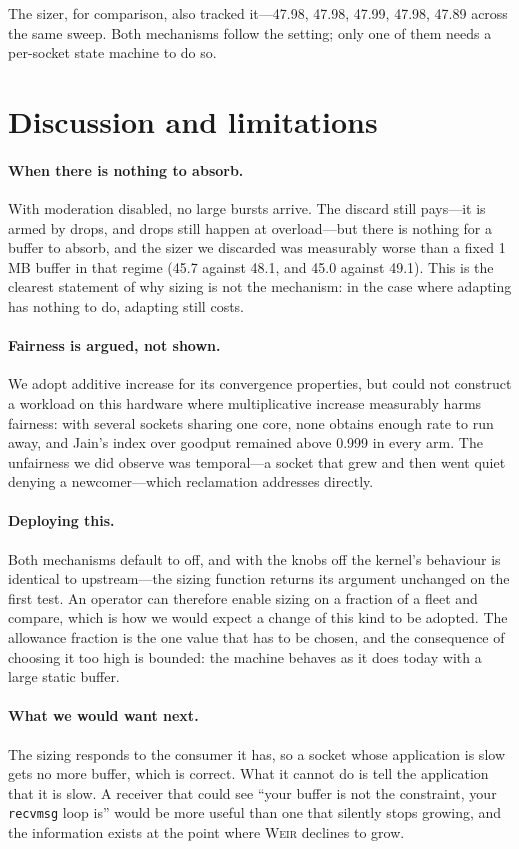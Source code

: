 \documentclass[letterpaper,twocolumn,10pt]{article}
\newcommand{\sys}{\textsc{Weir}\xspace}
\begin{document}
The sizer, for comparison, also tracked it---47.98, 47.98, 47.99, 47.98, 47.89
across the same sweep. Both mechanisms follow the setting; only one of them
needs a per-socket state machine to do so.

\section{Discussion and limitations}

\paragraph{When there is nothing to absorb.} With moderation disabled, no large
bursts arrive. The discard still pays---it is armed by drops, and drops still
happen at overload---but there is nothing for a buffer to absorb, and the sizer
we discarded was measurably worse than a fixed 1\,MB buffer in that regime
(45.7 against 48.1, and 45.0 against 49.1). This is the clearest statement of
why sizing is not the mechanism: in the case where adapting has nothing to do,
adapting still costs.

\paragraph{Fairness is argued, not shown.} We adopt additive increase for its
convergence properties, but could not construct a workload on this hardware
where multiplicative increase measurably harms fairness: with several sockets
sharing one core, none obtains enough rate to run away, and Jain's index over
goodput remained above 0.999 in every arm. The unfairness we did observe was
temporal---a socket that grew and then went quiet denying a newcomer---which
reclamation addresses directly.

\paragraph{Deploying this.} Both mechanisms default to off, and with the knobs
off the kernel's behaviour is identical to upstream---the sizing function
returns its argument unchanged on the first test. An operator can therefore
enable sizing on a fraction of a fleet and compare, which is how we would expect
a change of this kind to be adopted. The allowance fraction is the one value
that has to be chosen, and the consequence of choosing it too high is bounded:
the machine behaves as it does today with a large static buffer.

\paragraph{What we would want next.} The sizing responds to the consumer it has,
so a socket whose application is slow gets no more buffer, which is correct.
What it cannot do is tell the application that it is slow. A receiver that could
see ``your buffer is not the constraint, your \texttt{recvmsg} loop is'' would
be more useful than one that silently stops growing, and the information exists
at the point where \sys declines to grow.
\end{document}
